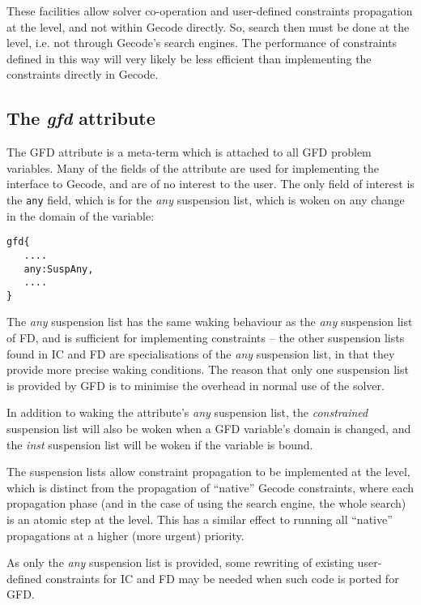 These facilities allow solver co-operation and user-defined 
constraints propagation at the {\eclipse} level, and not within Gecode directly.
So, search then must be done at the {\eclipse} level, i.e. not through Gecode's
search engines. The performance of constraints defined in this way will very
likely be less efficient than implementing the constraints directly in Gecode.

\subsection{The {\it gfd\/} attribute}

The GFD attribute is a meta-term which is attached to all GFD problem variables.
Many of the fields of the attribute are used for implementing the interface to
Gecode, and are of no interest to the user. The only field of interest is the
{\tt any} field, which is for the {\it any\/} suspension list, which is woken on 
any change in the domain of the variable:

\begin{verbatim}
gfd{
   ....
   any:SuspAny,
   ....
}
\end{verbatim}

The {\it any\/} suspension list has the same waking behaviour as the 
{\it any\/} suspension
list of FD, and is sufficient for implementing constraints -- the other 
suspension lists found in IC and FD are specialisations of the {\it any\/} 
suspension list, in that they provide more precise waking conditions. 
The reason that
only one suspension list is provided by GFD is to minimise the overhead in
normal use of the solver. 


In addition to waking the attribute's {\it any\/} suspension list, the 
{\it constrained\/}
suspension list will also be woken when a GFD variable's domain is changed,
and the {\it inst\/} suspension list will be woken if the variable is bound.

The suspension lists allow constraint propagation to be implemented at the
{\eclipse} level, which is distinct from the propagation of ``native'' Gecode
constraints, where each propagation phase (and in the case of using the 
search engine, the whole search) is an atomic step at the {\eclipse} level. 
This has a similar effect to running all ``native'' propagations
at a higher (more urgent) priority.
 
As only the {\it any\/} suspension list is provided, some rewriting of existing
user-defined constraints for IC and FD may be needed when such code is ported
for GFD.

